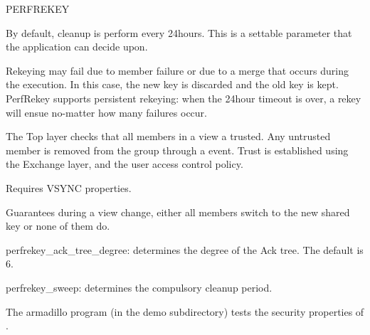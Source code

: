 \begin{Layer}{PERFREKEY}
\begin{Protocol}
By default, cleanup is perform every 24hours. This is a settable
parameter that the application can decide upon. 

Rekeying may fail due to member failure or due to a merge that
occurs during the execution. In this case, the new key is discarded
and the old key is kept. PerfRekey supports persistent rekeying: when
the 24hour timeout is over, a rekey will ensue no-matter how many
failures occur. 

The Top layer checks that all members in a view a trusted. Any
untrusted member is removed from the group through a 
event. Trust is established using the Exchange layer, and the user
access control policy.
\end{Protocol}

\begin{Properties}
\item Requires VSYNC properties.
\item
Guarantees during a view change, either all members switch to the new
shared key or none of them do.
\end{Properties}

\begin{Parameters}
\item {perfrekey\_ack\_tree\_degree:} determines the degree of the Ack
tree. The default is 6.
\item {perfrekey\_sweep:} determines the compulsory cleanup period. 
\end{Parameters}

\begin{Sources}
\end{Sources}

\begin{GenEvent}
\genevent{\DnCast}
\genevent{\DnSend}
\end{GenEvent}

\begin{Testing}
\item 
The armadillo program (in the demo subdirectory) tests the security properties
of \ensemble.
\end{Testing}

\end{Layer}



